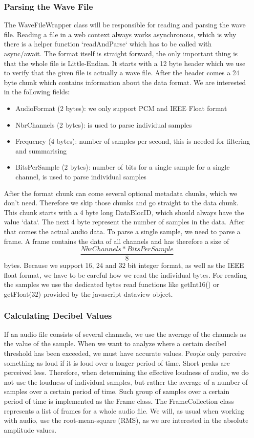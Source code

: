 \subsubsection{Parsing the Wave File}
The WaveFileWrapper class will be responsible for reading and parsing the wave file.
Reading a file in a web context always works asynchronous, which is why there is a helper function `readAndParse` which has to be called with async/await.
The format itself is straight forward\cite{wav_file_format_wikipedia}, the only important thing is that the whole file is Little-Endian.
It starts with a 12 byte header which we use to verify that the given file is actually a wave file.
After the header comes a 24 byte chunk which contains information about the data format.
We are interested in the following fields:
\begin{itemize}
    \item AudioFormat (2 bytes): we only support PCM and IEEE Float format
    \item NbrChannels (2 bytes): is used to parse individual samples
    \item Frequency (4 bytes): number of samples per second, this is needed for filtering and summarising
    \item BitsPerSample (2 bytes): number of bits for a single sample for a single channel, is used to parse individual samples
\end{itemize}
After the format chunk can come several optional metadata chunks, which we don't need. Therefore we skip those chunks and go straight to the data chunk.
This chunk starts with a 4 byte long DataBlocID, which should always have the value `data`.
The next 4 byte represent the number of samples in the data.
After that comes the actual audio data.
To parse a single sample, we need to parse a frame.
A frame contains the data of all channels and has therefore a size of \[\frac{NbrChannels * BitsPerSample}{8}\] bytes.
Because we support 16, 24 and 32 bit integer format, as well as the IEEE float format, we have to be careful how we read the individual bytes. 
For reading the samples we use the dedicated bytes read functions like getInt16() or getFloat(32) provided by the javascript dataview object.

\subsubsection{Calculating Decibel Values}
If an audio file consists of several channels, we use the average of the channels as the value of the sample.
When we want to analyze where a certain decibel threshold has been exceeded, we must have accurate values.
People only perceive something as loud if it is loud over a longer period of time.
Short peaks are perceived less.
Therefore, when determining the effective loudness of audio, we do not use the loudness of individual samples,
but rather the average of a number of samples over a certain period of time.
Such group of samples over a certain period of time is implemented as the Frame class. The FrameCollection class represents
a list of frames for a whole audio file.
We will, as usual when working with audio, use the root-mean-square (RMS), as we are interested in the absolute amplitude values.

